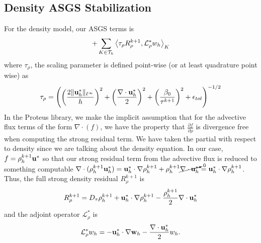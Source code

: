 \documentclass[letterpaper]{erdc}
\begin{document}
\subsection{Density ASGS Stabilization} For the density model, our ASGS terms is
\begin{equation}
  +\displaystyle\sum_{K\in\mathcal{T}_h}\left\langle \tau_{\rho} R_{\rho}^{k+1}, \mathcal{L}_{\rho}^{*} w_h \right\rangle_{K}
\end{equation}
where $\tau_{\rho}$, the scaling parameter is defined point-wise (or at least
quadrature point wise) as
\begin{align}
  \tau_{\rho} = \left(\left(\frac{2\|\textbf{u}^{*}_h\|_{\ell^{\infty}}}{h}\right)^2 + \left(\frac{\nabla\cdot \textbf{u}^{*}_h}{2}\right)^2 + \left( \frac{\beta_0}{\tau^{k+1}} \right)^2 + \epsilon_{tol}\right)^{-1/2}
\end{align}
In the Proteus library, we make the implicit assumption that for the advective
flux terms of the form $\nabla\cdot(f)$, we have the property that
$\frac{\partial f}{\partial\rho}$ is divergence free when computing the strong
residual term.  We have taken the partial with respect to density since we are
talking about the density equation.  In our case, $f = \rho_h^{k+1}\textbf{u}^{*}$ so
that our strong residual term from the advective flux is reduced to something
computable
$\nabla\cdot(\rho^{k+1}_h\textbf{u}^{*}_h) = \textbf{u}^{*}_h\cdot\nabla\rho_h^{k+1} +
\rho^{k+1}_h\cancelto{0}{\nabla\cdot\textbf{u}^{*}_h} =
\textbf{u}^{*}_h\cdot\nabla\rho_h^{k+1}$.
Thus, the full strong density residual $R_{\rho}^{k+1}$ is
\begin{equation}
  R_{\rho}^{k+1} = D_\tau \rho^{k+1}_h + \textbf{u}^{*}_h\cdot\nabla\rho_h^{k+1} - \frac{\rho_h^{k+1}}{2}\nabla\cdot\textbf{u}^{*}_h
\end{equation}
and the adjoint operator $\mathcal{L}_{\rho}^{*}$ is
\begin{equation}
  \mathcal{L}_{\rho}^{*} w_h = -\textbf{u}_h^{*}\cdot\nabla\textbf{w}_h -\frac{\nabla\cdot\textbf{u}^{*}_h}{2} w_h.
\end{equation}
\end{document}
